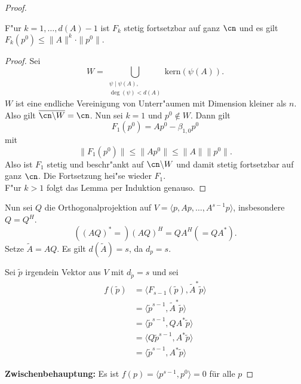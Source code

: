 \begin{proof}
%
%
	\begin{lem}
	F"ur $k=1,\dots,d(A)-1$ ist $F_k$ stetig fortsetzbar auf ganz $\cn$ und es gilt $F_k(p^0)\leq\parallel A\parallel^k \cdot \parallel p^0 \parallel .$
	\end{lem}
	\begin{proof}
Sei
\[
W= \bigcup_{\substack{\psi \mid \psi(A), \\ \deg{(\psi)}<d(A)}} \text{kern}(\psi(A)).
\]
	$W$ ist eine endliche Vereinigung von Unterr"aumen mit Dimension kleiner als $n$. Also gilt $\overline{\cn \backslash W}=\cn$.
	Nun sei $k=1$ und $p^0 \not \in W$. Dann gilt
	 \[
      F_1(p^0)=Ap^0-\beta_{1,0}p^0
        \]
mit
	 \[
	 \| F_1(p^0)\| \leq \| Ap^0\| \leq \| A \| \| p^0\| .
	 \]
 	 Also ist $F_1$ stetig und beschr"ankt auf $\cn \backslash W$ und damit stetig fortsetzbar auf ganz $\cn$. Die Fortsetzung hei"se wieder $F_1$. \\
F"ur $k >1$ folgt das Lemma per Induktion genauso.
	\end{proof}



Nun sei $Q$ die
Orthogonalprojektion auf $V=\langle p,
Ap,\dots,A^{s-1}p\rangle$, insbesondere $Q=Q^H$.
\begin{equation*}
 \left( (AQ)^* =  \right) (AQ)^H = QA^H \left( = QA^* \right) .
\end{equation*}
Setze $\tilde A =AQ$. Es gilt $d(\tilde A)=s$, da $d_p=s$.

Sei $\tilde p$ irgendein Vektor aus $V$ mit $d_{\tilde p}=s$ und sei
\begin{align*}
  f(\tilde p)
  &= \langle F_{s-1}(\tilde p), {\tilde A}^*\tilde p\rangle
  \\
  &= \langle\tilde p^{s-1}, {\tilde A}^*\tilde p\rangle
  \\
  &= \langle\tilde p^{s-1}, QA^*\tilde p\rangle
  \\
  &= \langle Q\tilde p^{s-1}, A^*\tilde p\rangle
  \\
  &= \langle \tilde p^{s-1}, A^*\tilde p\rangle
\end{align*}

\medskip

\textbf{Zwischenbehauptung:}
Es ist $f(p)=\langle p^{s-1},p^0\rangle=0$ f\"ur alle $p$


\end{proof}
